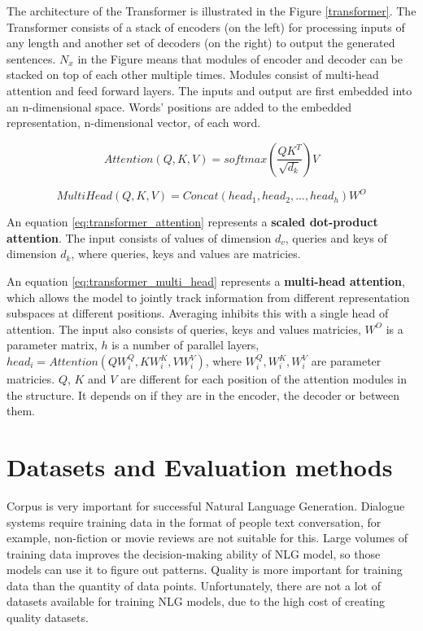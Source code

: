 The architecture of the Transformer is illustrated in the Figure \ref{transformer}. The Transformer consists of a stack of encoders (on the left) for processing inputs of any length and another set of decoders (on the right) to output the generated sentences. $N_x$ in the Figure means that modules of encoder and decoder can be stacked on top of each other multiple times. Modules consist of multi-head attention and feed forward layers. The inputs and output are first embedded into an n-dimensional space. Words' positions are added to the embedded representation, n-dimensional vector, of each word.

\begin{equation} \label{eq:transformer_attention}
Attention(Q, K, V) = softmax(\frac{QK^T}{\sqrt{d_k}})V
\end{equation}

\begin{equation} \label{eq:transformer_multi_head}
MultiHead(Q, K, V) = Concat(head_1, head_2, ..., head_h)W^O
\end{equation}

An equation \ref{eq:transformer_attention} represents a \textbf{scaled dot-product attention}. The input consists of values of dimension $d_v$, queries and keys of dimension $d_k$, where queries, keys and values are matricies.

An equation \ref{eq:transformer_multi_head} represents a \textbf{multi-head attention}, which allows the model to jointly track information from different representation subspaces at different positions. Averaging inhibits this with a single head of attention. The input also consists of queries, keys and values matricies, $W^O$ is a parameter matrix, $h$ is a number of parallel layers, $head_i = Attention(QW_i^Q, KW_i^K, VW_i^V)$, where $W_i^Q, W_i^K, W_i^V$ are parameter matricies. $Q$, $K$ and $V$ are different for each position of the attention modules in the structure. It depends on if they are in the encoder, the decoder or between them.


\chapter{Datasets and Evaluation methods}
Corpus is very important for successful Natural Language Generation. Dialogue systems require training data in the format of people text conversation, for example, non-fiction or movie reviews are not suitable for this. Large volumes of training data improves the decision-making ability of NLG model, so those models can use it to figure out patterns. Quality is more important for training data than the quantity of data points. Unfortunately, there are not a lot of datasets available for training NLG models, due to the high cost of creating quality datasets. 

